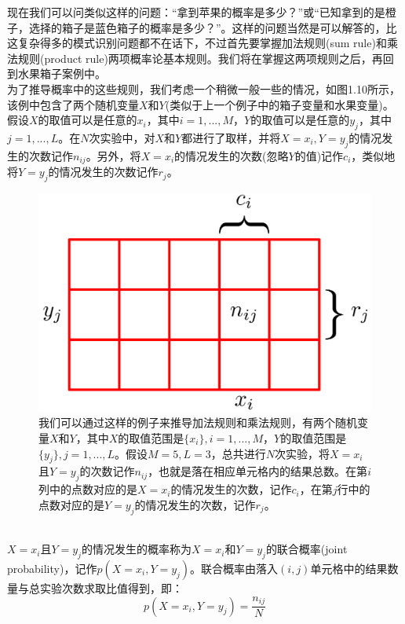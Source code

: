 \documentclass[b5paper]{book}
\numberwithin{equation}{chapter}
\begin{document}
{	\indent 现在我们可以问类似这样的问题：“拿到苹果的概率是多少？”或“已知拿到的是橙子，选择的箱子是蓝色箱子的概率是多少？”。这样的问题当然是可以解答的，比这复杂得多的模式识别问题都不在话下，不过首先要掌握加法规则(sum rule)和乘法规则(product rule)两项概率论基本规则。我们将在掌握这两项规则之后，再回到水果箱子案例中。\\
	\indent 为了推导概率中的这些规则，我们考虑一个稍微一般一些的情况，如图1.10所示，该例中包含了两个随机变量$X$和$Y$(类似于上一个例子中的箱子变量和水果变量)。假设$X$的取值可以是任意的$x_i$，其中$i=1,...,M$，$Y$的取值可以是任意的$y_j$，其中$j=1,...,L$。在$N$次实验中，对$X$和$Y$都进行了取样，并将$X=x_i,Y=y_j$的情况发生的次数记作$n_{ij}$。另外，将$X=x_i$的情况发生的次数(忽略$Y$的值)记作$c_i$，类似地将$Y=y_j$的情况发生的次数记作$r_j$。
	\begin{figure}[ht]
		\centering
		\includegraphics[scale=0.8]{Images/1-10.png}
		\caption{我们可以通过这样的例子来推导加法规则和乘法规则，有两个随机变量$X$和$Y$，其中$X$的取值范围是$\{x_i\},i=1,...,M$，$Y$的取值范围是$\{y_j\},j=1,...,L$。假设$M=5,L=3$，总共进行$N$次实验，将$X=x_i$且$Y=y_j$的次数记作$n_{ij}$，也就是落在相应单元格内的结果总数。在第$i$列中的点数对应的是$X=x_i$的情况发生的次数，记作$c_i$，在第$j$行中的点数对应的是$Y=y_j$的情况发生的次数，记作$r_j$。} 
		\label{fig:1-10}
	\end{figure}
	\\
	\indent $X=x_i$且$Y=y_j$的情况发生的概率称为$X=x_i$和$Y=y_j$的联合概率(joint probability)，记作$p(X=x_i,Y=y_j)$。联合概率由落入$(i,j)$单元格中的结果数量与总实验次数求取比值得到，即：
	\begin{equation}
		p(X=x_i,Y=y_j)=\frac{n_{ij}}{N}
	\end{equation}
}
\end{document}

